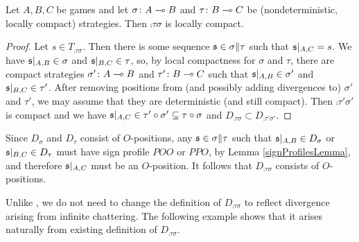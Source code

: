 \documentclass{article}
\begin{document}
\begin{proposition}
  Let $A,B,C$ be games and let $\sigma\colon A\multimap B$ and $\tau\colon B\multimap C$ be (nondeterministic, locally compact) strategies.  Then $\comp\tau\sigma$ is locally compact.
  \begin{proof}
    Let $s\in T_{\comp\tau\sigma}$.  Then there is some sequence $\mathfrak s\in\sigma\|\tau$ such that $\mathfrak s\vert_{A,C}=s$.  We have $\mathfrak s\vert_{A,B}\in\sigma$ and $\mathfrak s\vert_{B,C}\in\tau$, so, by local compactness for $\sigma$ and $\tau$, there are compact strategies $\sigma'\colon A\multimap B$ and $\tau'\colon B\multimap C$ such that $\mathfrak s\vert_{A,B}\in\sigma'$ and $\mathfrak s\vert_{B,C}\in\tau'$.  After removing positions from (and possibly adding divergences to) $\sigma'$ and $\tau'$, we may assume that they are deterministic (and still compact).  Then $\comp{\tau'}{\sigma'}$ is compact and we have $\mathfrak s\vert_{A,C}\in\tau' \circ \sigma'\subseteq\tau \circ \sigma$ and $D_{\comp\tau\sigma}\subset D_{\comp{\tau'}{\sigma'}}$.
  \end{proof}
\end{proposition}

\begin{remark}
  Since $D_\sigma$ and $D_\tau$ consist of $O$-positions, any $\mathfrak s\in\sigma\|\tau$ such that $\mathfrak s\vert_{A,B}\in D_\sigma$ or $\mathfrak s\vert_{B,C}\in D_\tau$ must have sign profile $POO$ or $PPO$, by Lemma \ref{signProfilesLemma}, and therefore $\mathfrak s\vert_{A,C}$ must be an $O$-position.  It follows that $D_{\comp\tau\sigma}$ consists of $O$-positions.
\end{remark}

Unlike \cite{mcCHFiniteND}, we do not need to change the definition of $D_{\comp\tau\sigma}$ to reflect divergence arising from infinite chattering.  The following example shows that it arises naturally from existing definition of $D_{\comp\tau\sigma}$.
\end{document}
